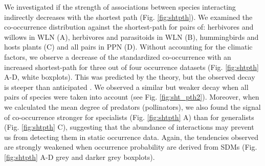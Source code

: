 We investigated if the strength of associations between species
interacting indirectly decreases with the shortest path (Fig.
\ref{fig:shtpth}). We examined the co-occurrence distribution against
the shortest-path for pairs of: herbivores and willows in WLN (A),
herbivores and parasitoids in WLN (B), hummingbirds and hosts plants (C)
and all pairs in PPN (D). Without accounting for the climatic factors,
we observe a decrease of the standardized co-occurrence with an
increased shortest-path for three out of four occurrence datasets (Fig.
\ref{fig:shtpth} A-D, white boxplots). This was predicted by the theory,
but the observed decay is steeper than anticipated \citep{Cazelles2016}.
We observed a similar but weaker decay when all pairs of species were
taken into account (see Fig. \ref{fig:sht_pth2}). Moreover, when we
calculated the mean degree of predators (pollinators), we also found the
signal of co-occurrence stronger for specialists (Fig. \ref{fig:shtpth}
A) than for generalists (Fig. \ref{fig:shtpth} C), suggesting that the
abundance of interactions may prevent us from detecting them in static
occurrence data. Again, the tendencies observed are strongly weakened
when occurrence probability are derived from SDMs (Fig. \ref{fig:shtpth}
A-D grey and darker grey boxplots).

